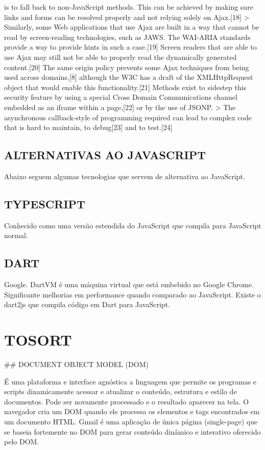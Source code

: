 \documentclass[11pt,a4paper]{article}
\begin{document}
is to fall back to non-JavaScript methods. This can be achieved by
making sure links and forms can be resolved properly and not relying
solely on Ajax.[18] > Similarly, some Web applications that use Ajax
are built in a way that cannot be read by screen-reading technologies,
such as JAWS. The WAI-ARIA standards provide a way to provide hints in
such a case.[19] Screen readers that are able to use Ajax may still not
be able to properly read the dynamically generated content.[20] The
same origin policy prevents some Ajax techniques from being used across
domains,[8] although the W3C has a draft of the XMLHttpRequest object
that would enable this functionality.[21] Methods exist to sidestep this
security feature by using a special Cross Domain Communications channel
embedded as an iframe within a page,[22] or by the use of JSONP. > The
asynchronous callback-style of programming required can lead to complex
code that is hard to maintain, to debug[23] and to test.[24]

\subsection{ ALTERNATIVAS AO JAVASCRIPT}

Abaixo seguem algumas tecnologias que servem de alternativa ao
JavaScript.

\subsection{ TYPESCRIPT}

Conhecido como uma versão estendida do JavaScript que compila para
JavaScript normal.

\subsection{ DART}

Google. DartVM é uma máquina virtual que está embebido no Google
Chrome. Significante melhorias em performance quando comparado
ao JavaScript. Existe o dart2js que compila código em Dart para
JavaScript.

\section{TOSORT}

## DOCUMENT OBJECT MODEL (DOM)

É uma plataforma e interface agnóstica a linguagem que permite os programas e scripts dinamicamente acessar e atualizar o conteúdo, estrutura e estilo de documentos. Pode ser novamente processado e o resultado aparecer na tela. O navegador cria um DOM quando ele processa os elementos e tags encontrados em um documento HTML. Gmail é uma aplicação de única página (single-page) que se baseia fortemente no DOM para gerar conteúdo dinâmico e interativo oferecido pelo DOM.
\end{document}
